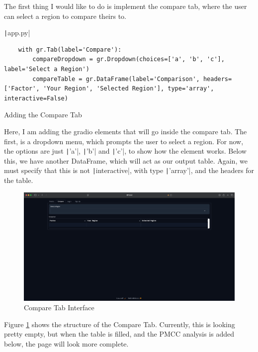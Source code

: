 \documentclass[12pt]{report}
\newcommand{\pil}[1]{\protect\texttt|#1|}
\begin{document}
The first thing I would like to do is implement the compare tab, where the user can select a region to compare theirs to.

\begin{listing}[H]
\pil{app.py}
\begin{verbatim}
    with gr.Tab(label='Compare'):
        compareDropdown = gr.Dropdown(choices=['a', 'b', 'c'], label='Select a Region')
        compareTable = gr.DataFrame(label='Comparison', headers=['Factor', 'Your Region', 'Selected Region'], type='array', interactive=False)
\end{verbatim}
\caption{Adding the Compare Tab}\label{cs:compareTab}
\end{listing}

Here, I am adding the gradio elements that will go inside the compare tab. The first, is a dropdown menu, which prompts the user to select a region. For now, the options are just \pil{'a'}, \pil{'b'} and \pil{'c'}, to show how the element works. Below this, we have another DataFrame, which will act as our output table. Again, we must specify that this is not \pil{interactive}, with type \pil{'array'}, and the headers for the table.

\begin{figure}[H]
\centering
\includegraphics[width=14cm]{ss17.1.png}
\caption{Compare Tab Interface}\label{fig:ss17.1}
\end{figure}

Figure \ref{fig:ss17.1} shows the structure of the Compare Tab. Currently, this is looking pretty empty, but when the table is filled, and the PMCC analysis is added below, the page will look more complete.
\end{document}
